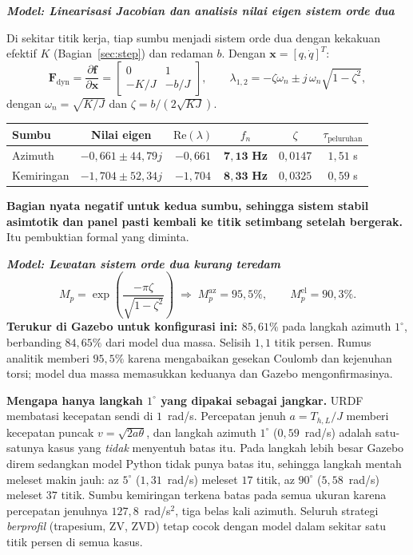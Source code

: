 \documentclass[11pt,a4paper]{article}
\newcommand{\degg}{^\circ}
\newcommand{\model}[1]{\textbf{\textit{Model: #1}}}
\begin{document}
\model{Linearisasi Jacobian dan analisis nilai eigen sistem orde dua}

Di sekitar titik kerja, tiap sumbu menjadi sistem orde dua dengan kekakuan efektif $K$ (Bagian~\ref{sec:step})
dan redaman $b$. Dengan $\bm{x} = [q,\dot q]^T$:
\begin{equation}
\bm{F}_{\mathrm{dyn}} = \frac{\partial \bm{f}}{\partial \bm{x}} =
\begin{bmatrix} 0 & 1 \\ -K/J & -b/J \end{bmatrix},
\qquad
\lambda_{1,2} = -\zeta\omega_n \pm j\,\omega_n\sqrt{1-\zeta^2},
\end{equation}
dengan $\omega_n = \sqrt{K/J}$ dan $\zeta = b/(2\sqrt{KJ})$.

\begin{longtable}{l c c c c c}
\toprule
\textbf{Sumbu} & \textbf{Nilai eigen} & $\mathrm{Re}(\lambda)$ & $f_n$ & $\zeta$ & $\tau_{\text{peluruhan}}$ \\
\midrule
Azimuth & $-0{,}661 \pm 44{,}79j$ & $-0{,}661$ & $\bm{7{,}13}$ \textbf{Hz} & $0{,}0147$ & $1{,}51$ s \\
Kemiringan & $-1{,}704 \pm 52{,}34j$ & $-1{,}704$ & $\bm{8{,}33}$ \textbf{Hz} & $0{,}0325$ & $0{,}59$ s \\
\bottomrule
\end{longtable}

\textbf{Bagian nyata negatif untuk kedua sumbu, sehingga sistem stabil asimtotik dan panel pasti kembali ke
titik setimbang setelah bergerak.} Itu pembuktian formal yang diminta.

\model{Lewatan sistem orde dua kurang teredam}
\begin{equation}
M_p = \exp\!\left( \frac{-\pi\zeta}{\sqrt{1-\zeta^2}} \right)
\;\Longrightarrow\;
M_p^{\mathrm{az}} = 95{,}5\%, \qquad M_p^{\mathrm{el}} = 90{,}3\%.
\end{equation}
\textbf{Terukur di Gazebo untuk konfigurasi ini: $85{,}61\%$} pada langkah azimuth $1\degg$, berbanding
$84{,}65\%$ dari model dua massa. Selisih $1{,}1$ titik persen. Rumus analitik memberi $95{,}5\%$ karena
mengabaikan gesekan Coulomb dan kejenuhan torsi; model dua massa memasukkan keduanya dan Gazebo
mengonfirmasinya.

\textbf{Mengapa hanya langkah $1\degg$ yang dipakai sebagai jangkar.} URDF membatasi kecepatan sendi di
$1$~rad/s. Percepatan jenuh $a = T_{h,L}/J$ memberi kecepatan puncak $v = \sqrt{2a\theta}$, dan langkah
azimuth $1\degg$ ($0{,}59$~rad/s) adalah satu-satunya kasus yang \emph{tidak} menyentuh batas itu. Pada
langkah lebih besar Gazebo direm sedangkan model Python tidak punya batas itu, sehingga langkah mentah
meleset makin jauh: az $5\degg$ ($1{,}31$~rad/s) meleset $17$ titik, az $90\degg$ ($5{,}58$~rad/s) meleset
$37$ titik. Sumbu kemiringan terkena batas pada semua ukuran karena percepatan jenuhnya $127{,}8$~rad/s$^2$,
tiga belas kali azimuth. Seluruh strategi \emph{berprofil} (trapesium, ZV, ZVD) tetap cocok dengan model
dalam sekitar satu titik persen di semua kasus.
\end{document}
